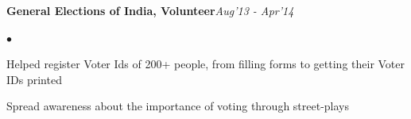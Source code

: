\documentclass[margin,line]{res}
\newenvironment{list2}{
  \begin{list}{$\bullet$}{%
      \setlength{\itemsep}{0in}
      \setlength{\parsep}{0in} \setlength{\parskip}{0in}
      \setlength{\topsep}{0in} \setlength{\partopsep}{0in} 
      \setlength{\leftmargin}{0.2in}}}{\end{list}}
\begin{document}
\begin{resume}
{\bf General Elections of India, Volunteer}{\hfill \em Aug'13 - Apr'14}
\vspace*{-0.15in}\\
\begin{list2}
\item Helped register Voter Ids of 200+ people, from filling forms to getting their Voter IDs printed 
\item Spread awareness about the importance of voting through street-plays 
\end{list2}
\end{resume}
\end{document}
